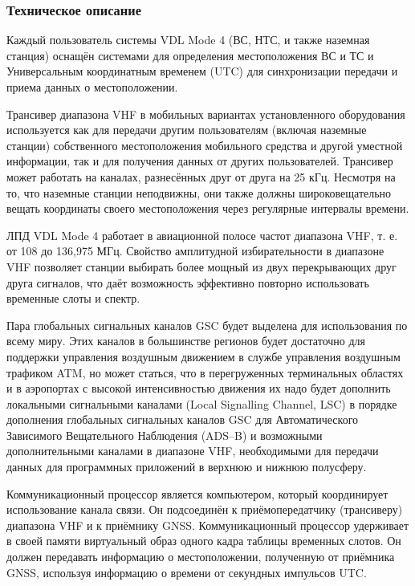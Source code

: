 \documentclass[a4paper,12pt]{report} %
\begin{document}
\subsubsection{Техническое описание}

Каждый пользователь системы VDL Mode 4 (ВС, НТС, и также наземная станция)
оснащён системами для определения местоположения ВС и ТС и Универсальным
координатным временем (UTC) для синхронизации передачи и приема данных о
местоположении.

Трансивер диапазона VHF в мобильных вариантах установленного оборудования
используется как для передачи другим пользователям (включая наземные станции)
собственного местоположения мобильного средства и другой уместной информации,
так и для получения данных от других пользователей. Трансивер может работать на
каналах, разнесённых друг от друга на 25 кГц. Несмотря на то, что наземные
станции неподвижны, они также должны широковещательно вещать координаты своего
местоположения через регулярные интервалы времени.

ЛПД VDL Mode 4 работает в авиационной полосе частот диапазона VHF, т. е. от 108
до 136,975 МГц. Свойство амплитудной избирательности в диапазоне VHF позволяет
станции выбирать более мощный из двух перекрывающих друг друга сигналов, что
даёт возможность эффективно повторно использовать временные слоты и спектр.

Пара глобальных сигнальных каналов GSC будет выделена для использования по всему
миру. Этих каналов в большинстве регионов будет достаточно для поддержки управления
воздушным движением в службе управления воздушным трафиком ATM, но может статься, что
в перегруженных терминальных областях и в аэропортах с высокой интенсивностью движения
их надо будет дополнить локальными сигнальными каналами (Local Signalling Channel, LSC) в
порядке дополнения глобальных сигнальных каналов GSC для Автоматического Зависимого
Вещательного Наблюдения (ADS--B) и возможными дополнительными каналами в диапазоне
VHF, необходимыми для передачи данных для программных приложений в верхнюю и нижнюю
полусферу.

Коммуникационный процессор является компьютером, который координирует
использование канала связи. Он подсоединён к приёмопередатчику (трансиверу)
диапазона VHF и к приёмнику GNSS. Коммуникационный процессор удерживает в своей
памяти виртуальный образ одного кадра таблицы временных слотов. Он должен
передавать информацию о местоположении, полученную от приёмника GNSS, используя
информацию о времени от секундных импульсов UTC.
\end{document}
